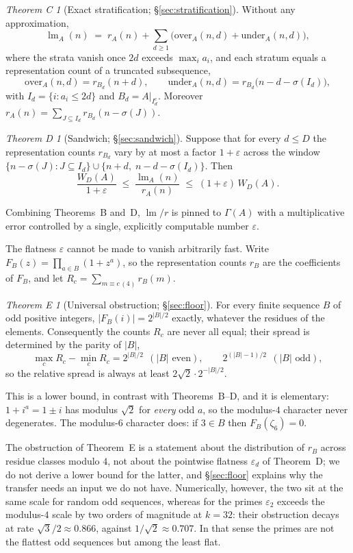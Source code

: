 \documentclass[11pt,a4paper]{article}
\theoremstyle{plain}
\theoremstyle{definition}
\theoremstyle{remark}
\newtheorem{theoremC}{Theorem C}
\newtheorem{theoremD}{Theorem D}
\newtheorem{theoremE}{Theorem E}
\DeclareMathOperator{\lm}{lm}
\newcommand{\ovr}{\mathrm{over}}
\newcommand{\undr}{\mathrm{under}}
\begin{document}
\begin{theoremC}[Exact stratification; \S\ref{sec:stratification}]
Without any approximation,
\[
  \lm_A(n)\;=\;r_A(n)+\sum_{d\ge1}\bigl(\ovr_A(n,d)+\undr_A(n,d)\bigr),
\]
where the strata vanish once $2d$ exceeds $\max_i a_i$, and each stratum equals
a representation count of a truncated subsequence,
\[
  \ovr_A(n,d)=r_{B_d}(n+d),
  \qquad
  \undr_A(n,d)=r_{B_d}\bigl(n-d-\sigma(I_d)\bigr),
\]
with $I_d=\{i:a_i\le2d\}$ and $B_d=A|_{I_d^{c}}$. Moreover
$r_A(n)=\sum_{J\subseteq I_d}r_{B_d}(n-\sigma(J))$.
\end{theoremC}

\begin{theoremD}[Sandwich; \S\ref{sec:sandwich}]
Suppose that for every $d\le D$ the representation counts $r_{B_d}$ vary by at
most a factor $1+\varepsilon$ across the window
$\{n-\sigma(J):J\subseteq I_d\}\cup\{n+d,\;n-d-\sigma(I_d)\}$. Then
\[
  \frac{W_D(A)}{1+\varepsilon}\;\le\;\frac{\lm_A(n)}{r_A(n)}\;\le\;(1+\varepsilon)\,W_D(A).
\]
\end{theoremD}

Combining Theorems~B and~D, $\lm/r$ is pinned to $\Gamma(A)$ with a
multiplicative error controlled by a single, explicitly computable number
$\varepsilon$.

The flatness $\varepsilon$ cannot be made to vanish arbitrarily fast. Write
$F_B(z)=\prod_{a\in B}(1+z^{a})$, so the representation counts $r_B$ are the
coefficients of $F_B$, and let $R_c=\sum_{m\equiv c\,(4)}r_B(m)$.

\begin{theoremE}[Universal obstruction; \S\ref{sec:floor}]
For every finite sequence $B$ of odd positive integers, $|F_B(i)|=2^{|B|/2}$
exactly, whatever the residues of the elements. Consequently the counts $R_c$
are never all equal; their spread is determined by the parity of $|B|$,
\[
  \max_c R_c-\min_c R_c=2^{|B|/2}\ \ (|B|\text{ even}),
  \qquad 2^{(|B|-1)/2}\ \ (|B|\text{ odd}),
\]
so the relative spread is always at least $2\sqrt2\cdot2^{-|B|/2}$.
\end{theoremE}

This is a lower bound, in contrast with Theorems~B--D, and it is elementary:
$1+i^{a}=1\pm i$ has modulus $\sqrt2$ for \emph{every} odd $a$, so the
modulus-$4$ character never degenerates. The modulus-$6$ character does: if
$3\in B$ then $F_B(\zeta_6)=0$.

The obstruction of Theorem~E is a statement about the distribution of $r_B$
across residue classes modulo $4$, not about the pointwise flatness
$\varepsilon_d$ of Theorem~D; we do not derive a lower bound for the latter,
and \S\ref{sec:floor} explains why the transfer needs an input we do not have.
Numerically, however, the two sit at the same scale for random odd sequences,
whereas for the primes $\varepsilon_2$ exceeds the modulus-$4$ scale by two
orders of magnitude at $k=32$: their obstruction decays at rate
$\sqrt3/2\approx0.866$, against $1/\sqrt2\approx0.707$. In that sense the
primes are not the flattest odd sequences but among the least flat.
\end{document}
